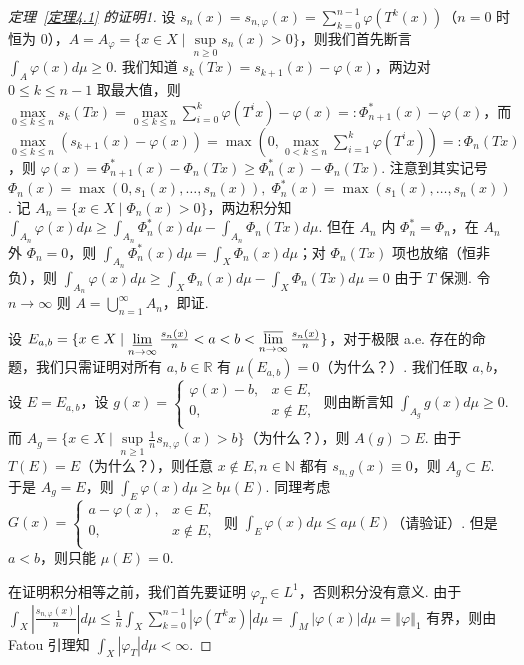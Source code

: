 \documentclass[11pt, a4paper, oneside]{ctexart}
\newcommand{\N}{\mathbb{N}}
\newcommand{\R}{\mathbb{R}}
\newcommand{\abs}[1]{\left|{#1}\right|}
\newcommand{\norm}[1]{\left\Vert{#1}\right\Vert}
\begin{document}
    \begin{proof}[定理~\ref{定理4.1} 的证明1]
        设 $s_n(x)=s_{n,\varphi}(x)=\sum\limits_{k=0}^{n-1}\varphi(T^k(x))$（$n=0$ 时恒为 $0$），$A=A_{\varphi}=\{x\in X\mid \sup\limits_{n\geq 0}s_n(x)>0\}$，则我们首先断言 $\int_{A}\varphi(x)d\mu\geq 0$. 我们知道 $s_k(Tx)=s_{k+1}(x)-\varphi(x)$，两边对 $0\leq k\leq n-1$ 取最大值，则 $\max\limits_{0\leq k\leq n}s_k(Tx)=\max\limits_{0\leq k\leq n}\sum\limits_{i=0}^{k}\varphi(T^i x)-\varphi(x)=:\Phi_{n+1}^*(x)-\varphi(x)$，而 $\max\limits_{0\leq k\leq n}(s_{k+1}(x)-\varphi(x))=\max(0,\max\limits_{0<k\leq n}\sum\limits_{i=1}^{k}\varphi(T^i x))=:\Phi_n(Tx)$，则 $\varphi(x)=\Phi_{n+1}^*(x)-\Phi_n(Tx)\geq \Phi_n^*(x)-\Phi_n(Tx)$. 注意到其实记号 $\Phi_n(x)=\max(0,s_1(x),\ldots,s_n(x)),\; \Phi_n^*(x)=\max(s_1(x),\ldots,s_n(x))$. 记 $A_n=\{x\in X\mid \Phi_n(x)>0\}$，两边积分知 $\int_{A_n}\varphi(x)d\mu\geq \int_{A_n}\Phi_n^*(x)d\mu-\int_{A_n}\Phi_n(Tx)d\mu$. 但在 $A_n$ 内 $\Phi_n^*=\Phi_n$，在 $A_n$ 外 $\Phi_n=0$，则 $\int_{A_n}\Phi_n^*(x)d\mu=\int_X \Phi_n(x)d\mu$；对 $\Phi_n(Tx)$ 项也放缩（恒非负），则 $\int_{A_n}\varphi(x)d\mu\geq \int_{X}\Phi_n(x)d\mu-\int_{X}\Phi_n(Tx)d\mu=0$ 由于 $T$ 保测. 令 $n\to\infty$ 则 $A=\bigcup\limits_{n=1}^{\infty}A_n$，即证.

        设 $E_{a,b}=\{x\in X\mid \varliminf\limits_{n\to\infty}\frac{s_n(x)}{n}<a<b<\varlimsup\limits_{n\to\infty}\frac{s_n(x)}{n}\}$，对于极限 a.e. 存在的命题，我们只需证明对所有 $a,b\in \R$ 有 $\mu(E_{a,b})=0$（为什么？）. 我们任取 $a,b$，设 $E=E_{a,b}$，设 $g(x)=\begin{cases}
            \varphi(x)-b,&x\in E,\\
            0,&x\notin E,\\
        \end{cases}$ 则由断言知 $\int_{A_g}g(x)d\mu\geq 0$. 而 $A_g=\{x\in X\mid \sup\limits_{n\geq 1}\frac{1}{n}s_{n,\varphi}(x)>b\}$（为什么？），则 $A(g)\supset E$. 由于 $T(E)=E$（为什么？），则任意 $x\notin E, n\in\N$ 都有 $s_{n,g}(x)\equiv 0$，则 $A_g\subset E$. 于是 $A_g=E$，则 $\int_{E}\varphi(x)d\mu\geq b\mu(E)$. 同理考虑 $G(x)=\begin{cases}
            a-\varphi(x),&x\in E,\\
            0,&x\notin E,\\
        \end{cases}$ 则 $\int_{E}\varphi(x)d\mu\leq a\mu(E)$（请验证）. 但是 $a<b$，则只能 $\mu(E)=0$.

        在证明积分相等之前，我们首先要证明 $\varphi_T\in L^1$，否则积分没有意义. 由于 $\int_{X}\abs{\frac{s_{n,\varphi}(x)}{n}}d\mu\leq\frac{1}{n}\int_{X}\sum\limits_{k=0}^{n-1}\abs{\varphi(T^k x)}d\mu=\int_{M}\abs{\varphi(x)}d\mu=\norm{\varphi}_1$ 有界，则由 Fatou 引理知 $\int_{X}\abs{\varphi_T} d\mu<\infty$.


\end{proof}
\end{document}
